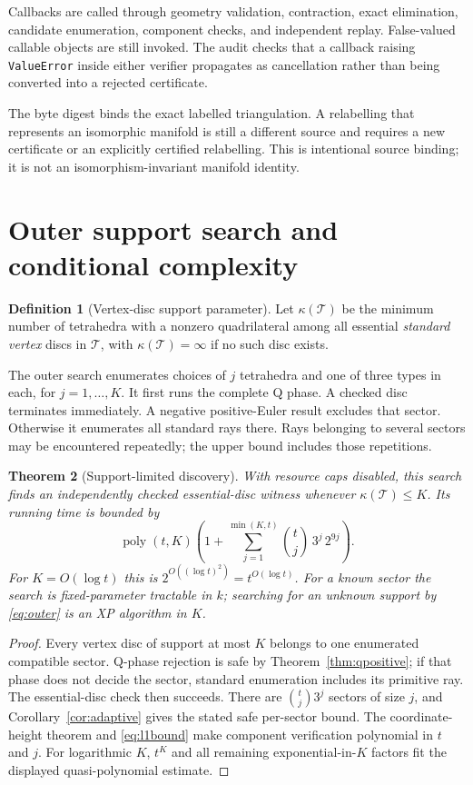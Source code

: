 \documentclass[11pt]{article}
\newtheorem{theorem}{Theorem}[section]
\theoremstyle{definition}
\newtheorem{definition}[theorem]{Definition}
\theoremstyle{remark}
\newcommand{\poly}{\operatorname{poly}}
\newcommand{\code}[1]{\texttt{#1}}
\begin{document}
Callbacks are called through geometry validation, contraction, exact
elimination, candidate enumeration, component checks, and independent replay.
False-valued callable objects are still invoked. The audit checks that a
callback raising \code{ValueError} inside either verifier propagates as
cancellation rather than being converted into a rejected certificate.

The byte digest binds the exact labelled triangulation. A relabelling that
represents an isomorphic manifold is still a different source and requires
a new certificate or an explicitly certified relabelling. This is intentional
source binding; it is not an isomorphism-invariant manifold identity.

\section{Outer support search and conditional complexity}
\label{sec:outer}

\begin{definition}[Vertex-disc support parameter]
Let $\kappa(\mathcal T)$ be the minimum number of tetrahedra with a nonzero
quadrilateral among all essential \emph{standard vertex} discs in
$\mathcal T$, with $\kappa(\mathcal T)=\infty$ if no such disc exists.
\end{definition}

The outer search enumerates choices of $j$ tetrahedra and one of three types
in each, for $j=1,\ldots,K$. It first runs the complete Q phase. A checked
disc terminates immediately. A negative positive-Euler result excludes that
sector. Otherwise it enumerates all standard rays there. Rays belonging to
several sectors may be encountered repeatedly; the upper bound includes
those repetitions.

\begin{theorem}[Support-limited discovery]
\label{thm:outer}
With resource caps disabled, this search finds an independently checked
essential-disc witness whenever $\kappa(\mathcal T)\le K$. Its running time is
bounded by
\begin{equation}
 \poly(t,K)\left(1+\sum_{j=1}^{\min(K,t)}\binom tj\,3^j\,2^{9j}\right).
 \label{eq:outer}
\end{equation}
For $K=O(\log t)$ this is $2^{O((\log t)^2)}=t^{O(\log t)}$.
For a known sector the search is fixed-parameter tractable in $k$; searching
for an unknown support by \eqref{eq:outer} is an XP algorithm in $K$.
\end{theorem}
\begin{proof}
Every vertex disc of support at most $K$ belongs to one enumerated compatible
sector. Q-phase rejection is safe by Theorem~\ref{thm:qpositive}; if that
phase does not decide the sector, standard enumeration includes its primitive
ray. The essential-disc check then succeeds. There are $\binom tj3^j$
sectors of size $j$, and Corollary~\ref{cor:adaptive} gives the stated safe
per-sector bound. The coordinate-height theorem and
\eqref{eq:l1bound} make component verification polynomial in $t$ and $j$.
For logarithmic $K$, $t^K$ and all remaining exponential-in-$K$ factors fit
the displayed quasi-polynomial estimate.
\end{proof}
\end{document}
